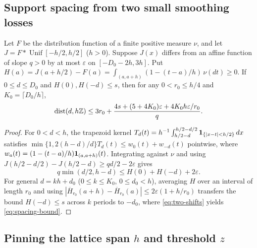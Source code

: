 \subsection{Support spacing from two small smoothing losses}

\begin{lemma}\label{lem:support-spacing}
Let $F$ be the distribution function of a finite positive measure $\nu$, and
let $J=F*\operatorname{Unif}[-h/2,h/2]$ ($h>0$). Suppose $J(x)$ differs from
an affine function of slope $q>0$ by at most $\varepsilon$ on
$[-D_0-2h,3h]$. Put $H(a)=J(a+h/2)-F(a)=\int_{(a,a+h)}(1-(t-a)/h)\,\nu(dt)\ge0$.
If $0\le d\le D_0$ and $H(0),H(-d)\le s$, then for any $0<r_0\le h/4$ and
$K_0=\lceil D_0/h\rceil$,
\begin{equation}\label{eq:spacing-bound}
 \operatorname{dist}(d,h\mathbb Z)\le3r_0+
 \frac{4s+(5+4K_0)\varepsilon+4K_0h\varepsilon/r_0}{q}.
\end{equation}
\end{lemma}
\begin{proof}
For $0<d<h$, the trapezoid kernel $T_d(t)=h^{-1}\int_{h/2-d}^{h/2-d/2}\mathbf 1_{\{|x-t|<h/2\}}\,dx$
satisfies $\min\{1,2(h-d)/d\}T_d(t)\le w_0(t)+w_{-d}(t)$ pointwise, where
$w_a(t)=(1-(t-a)/h)\mathbf 1_{(a,a+h)}(t)$. Integrating against $\nu$ and using
$J(h/2-d/2)-J(h/2-d)\ge qd/2-2\varepsilon$ gives
\begin{equation}\label{eq:two-shifts}
       q\min(d/2,h-d)\le H(0)+H(-d)+2\varepsilon.
\end{equation}
For general $d=kh+d_0$ ($0\le k\le K_0$, $0\le d_0<h$), averaging $H$ over an
interval of length $r_0$ and using $|\overline H_{r_0}(a+h)-\overline H_{r_0}(a)|\le2\varepsilon(1+h/r_0)$
transfers the bound $H(-d)\le s$ across $k$ periods to $-d_0$, where
\eqref{eq:two-shifts} yields \eqref{eq:spacing-bound}.
\end{proof}

\subsection{Pinning the lattice span $h$ and threshold $z$}

